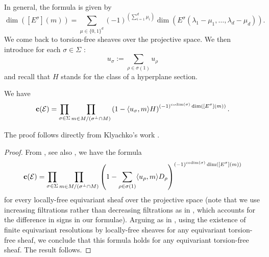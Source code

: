 \documentclass[a4paper,10pt]{amsart}
\theoremstyle{plain}{
    \newtheorem{theorem}{Theorem}[section]
    \newtheorem{lemma}[theorem]{Lemma}
    \newtheorem{corollary}[theorem]{Corollary}
    \newtheorem{proposition}[theorem]{Proposition}
    \newtheorem{conjecture}[theorem]{Conjecture}
}
\theoremstyle{definition}{
    \newtheorem{definition}[theorem]{Definition}
    \newtheorem{defn-thm}[theorem]{Definition-Theorem}
    \newtheorem{example}[theorem]{Example}
    \newtheorem{notation}[theorem]{Notation}
}
\theoremstyle{remark}{
    \newtheorem{remark}[theorem]{Remark}
    \newtheorem{problem}[theorem]{Problem}
    \newtheorem{question}[theorem]{Question}
}
\def\uc{{\bf c}}
\def\cE{\mathcal{E}}
\def\codim{\mathrm{codim}}
\begin{document}
In general, the formula   is given by
\begin{equation}
 \label{eq:dimension Esigma crochet}
 \dim( [E^\sigma](m) ) =  \sum_{\mu\in\lbrace 0, 1 \rbrace^{d}} (-1)^{(\sum_{i=1}^{d} \mu_i)} \dim\left(E^\sigma(\lambda_1-\mu_1,\ldots,\lambda_d-\mu_d) \right).
\end{equation}
We come back to torsion-free sheaves over the projective space. We then introduce for each $\sigma\in\Sigma$ :
\begin{equation}
 \label{eq:usigma}
u_\sigma:=\sum_{\rho\in\sigma(1)} u_\rho
\end{equation}
and recall that $H$ stands for the class of a hyperplane section.
\begin{proposition}
 \label{prop:formula total chern class general}
 We have
 \begin{equation}
  \label{eq:total chern class general}
 \uc(\cE)=\prod_{\sigma\in\Sigma}\prod_{m\in M/(\sigma^\perp\cap M)} \left(1-\langle u_\sigma, m \rangle H\right)^{(-1)^{\codim(\sigma)}\dim\left( [E^\sigma](m)\right) }.
 \end{equation}
\end{proposition}
The proof follows directly from Klyachko's work \cite{Kly90}.
\begin{proof}
 From \cite[Theorem 3.2.1]{Kly90}, see also \cite[Section 4.3.1]{KnuSha98}, we have the formula
 $$
 \uc(\cE)=\prod_{\sigma\in\Sigma}\prod_{m\in M/(\sigma^\perp\cap M)} \left(1-\sum_{\rho\in\sigma(1)}\langle u_\rho, m \rangle D_\rho\right)^{(-1)^{\codim(\sigma)}\dim\left( [E^\sigma](m)\right) }
 $$
 for every locally-free equivariant sheaf over the projective space (note that we use increasing filtrations rather than decreasing filtrations as in \cite{Kly90,KnuSha98}, which accounts for the difference in signs in our formulae). Arguing as in \cite[Proposition 3.16]{Koo11}, using the existence of finite equivariant resolutions by locally-free sheaves for any equivariant torsion-free sheaf, we conclude that this formula holds for any equivariant torsion-free sheaf. The result follows.
\end{proof}
\end{document}
